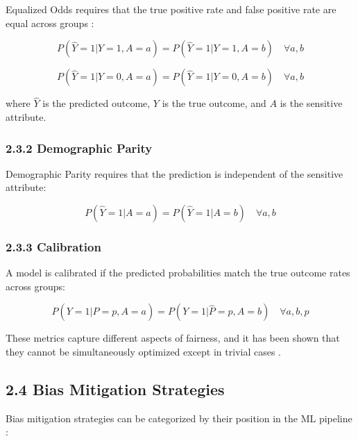 \documentclass[12pt,a4paper]{article}
\begin{document}
Equalized Odds requires that the true positive rate and false positive rate 
are equal across groups \cite{hardt2016}:

\begin{equation}
P(\hat{Y}=1|Y=1,A=a) = P(\hat{Y}=1|Y=1,A=b) \quad \forall a,b
\end{equation}

\begin{equation}
P(\hat{Y}=1|Y=0,A=a) = P(\hat{Y}=1|Y=0,A=b) \quad \forall a,b
\end{equation}

where $\hat{Y}$ is the predicted outcome, $Y$ is the true outcome, and $A$ 
is the sensitive attribute.

\subsubsection{2.3.2 Demographic Parity}

Demographic Parity requires that the prediction is independent of the 
sensitive attribute:

\begin{equation}
P(\hat{Y}=1|A=a) = P(\hat{Y}=1|A=b) \quad \forall a,b
\end{equation}

\subsubsection{2.3.3 Calibration}

A model is calibrated if the predicted probabilities match the true 
outcome rates across groups:

\begin{equation}
P(Y=1|\hat{P}=p,A=a) = P(Y=1|\hat{P}=p,A=b) \quad \forall a,b,p
\end{equation}

These metrics capture different aspects of fairness, and it has been shown 
that they cannot be simultaneously optimized except in trivial cases 
\cite{chouldechova2017}.

\subsection{2.4 Bias Mitigation Strategies}

Bias mitigation strategies can be categorized by their position in the 
ML pipeline \cite{friedler2019}:
\end{document}
